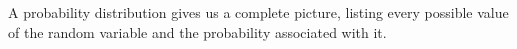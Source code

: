 \documentclass[preview]{standalone}
\begin{document}
\begin{center}
A probability distribution gives us a complete picture, listing every possible value of the random variable and the probability associated with it.
\end{center}
\end{document}

